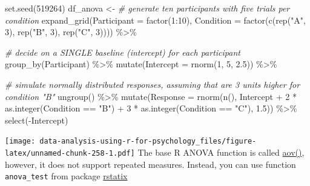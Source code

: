 \documentclass[
]{book}
\newenvironment{Shaded}{\begin{snugshade}}{\end{snugshade}}
\newcommand{\AttributeTok}[1]{\textcolor[rgb]{0.77,0.63,0.00}{#1}}
\newcommand{\CommentTok}[1]{\textcolor[rgb]{0.56,0.35,0.01}{\textit{#1}}}
\newcommand{\DecValTok}[1]{\textcolor[rgb]{0.00,0.00,0.81}{#1}}
\newcommand{\FloatTok}[1]{\textcolor[rgb]{0.00,0.00,0.81}{#1}}
\newcommand{\FunctionTok}[1]{\textcolor[rgb]{0.00,0.00,0.00}{#1}}
\newcommand{\NormalTok}[1]{#1}
\newcommand{\OtherTok}[1]{\textcolor[rgb]{0.56,0.35,0.01}{#1}}
\newcommand{\SpecialCharTok}[1]{\textcolor[rgb]{0.00,0.00,0.00}{#1}}
\newcommand{\StringTok}[1]{\textcolor[rgb]{0.31,0.60,0.02}{#1}}
\begin{document}
\begin{Shaded}
\begin{Highlighting}[]
\FunctionTok{set.seed}\NormalTok{(}\DecValTok{519264}\NormalTok{)}
\NormalTok{df\_anova }\OtherTok{\textless{}{-}}
  \CommentTok{\# generate ten participants with five trials per condition}
  \FunctionTok{expand\_grid}\NormalTok{(}\AttributeTok{Participant  =} \FunctionTok{factor}\NormalTok{(}\DecValTok{1}\SpecialCharTok{:}\DecValTok{10}\NormalTok{),}
              \AttributeTok{Condition =} \FunctionTok{factor}\NormalTok{(}\FunctionTok{c}\NormalTok{(}\FunctionTok{rep}\NormalTok{(}\StringTok{"A"}\NormalTok{, }\DecValTok{3}\NormalTok{), }\FunctionTok{rep}\NormalTok{(}\StringTok{"B"}\NormalTok{, }\DecValTok{3}\NormalTok{), }\FunctionTok{rep}\NormalTok{(}\StringTok{"C"}\NormalTok{, }\DecValTok{3}\NormalTok{)))) }\SpecialCharTok{\%\textgreater{}\%}
  
  \CommentTok{\# decide on a SINGLE baseline (intercept) for each participant}
  \FunctionTok{group\_by}\NormalTok{(Participant) }\SpecialCharTok{\%\textgreater{}\%}
  \FunctionTok{mutate}\NormalTok{(}\AttributeTok{Intercept =} \FunctionTok{rnorm}\NormalTok{(}\DecValTok{1}\NormalTok{, }\DecValTok{5}\NormalTok{, }\FloatTok{2.5}\NormalTok{)) }\SpecialCharTok{\%\textgreater{}\%}
  
  \CommentTok{\# simulate normally distributed responses, assuming that are 3 units higher for condition "B"}
  \FunctionTok{ungroup}\NormalTok{() }\SpecialCharTok{\%\textgreater{}\%}
  \FunctionTok{mutate}\NormalTok{(}\AttributeTok{Response =} \FunctionTok{rnorm}\NormalTok{(}\FunctionTok{n}\NormalTok{(), Intercept }\SpecialCharTok{+} \DecValTok{2} \SpecialCharTok{*} \FunctionTok{as.integer}\NormalTok{(Condition }\SpecialCharTok{==} \StringTok{"B"}\NormalTok{) }\SpecialCharTok{+} \DecValTok{3} \SpecialCharTok{*} \FunctionTok{as.integer}\NormalTok{(Condition }\SpecialCharTok{==} \StringTok{"C"}\NormalTok{), }\FloatTok{1.5}\NormalTok{)) }\SpecialCharTok{\%\textgreater{}\%}
  \FunctionTok{select}\NormalTok{(}\SpecialCharTok{{-}}\NormalTok{Intercept)}
\end{Highlighting}
\end{Shaded}

\texttt{[image: data-analysis-using-r-for-psychology\_files/figure-latex/unnamed-chunk-258-1.pdf]}
The base R ANOVA function is called \href{https://stat.ethz.ch/R-manual/R-devel/library/stats/html/aov.html}{aov()}, however, it does not support repeated measures. Instead, you can use function \texttt{anova\_test} from package \href{https://github.com/kassambara/rstatix}{rstatix}
\end{document}
